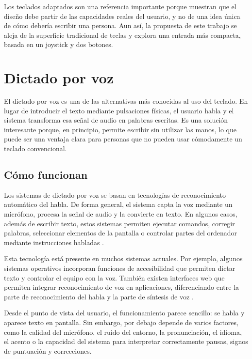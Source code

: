 Los teclados adaptados son una referencia importante porque muestran que el diseño debe partir de las capacidades reales del usuario, y no de una idea única de cómo debería escribir una persona. Aun así, la propuesta de este trabajo se aleja de la superficie tradicional de teclas y explora una entrada más compacta, basada en un joystick y dos botones.


\section{Dictado por voz}
\label{sec:dictado-voz}

El dictado por voz es una de las alternativas más conocidas al uso del teclado. En lugar de introducir el texto mediante pulsaciones físicas, el usuario habla y el sistema transforma esa señal de audio en palabras escritas. Es una solución interesante porque, en principio, permite escribir sin utilizar las manos, lo que puede ser una ventaja clara para personas que no pueden usar cómodamente un teclado convencional.

\subsection{Cómo funcionan}

Los sistemas de dictado por voz se basan en tecnologías de reconocimiento automático del habla. De forma general, el sistema capta la voz mediante un micrófono, procesa la señal de audio y la convierte en texto. En algunos casos, además de escribir texto, estos sistemas permiten ejecutar comandos, corregir palabras, seleccionar elementos de la pantalla o controlar partes del ordenador mediante instrucciones habladas \cite{webSpeechApi,microsoftVoiceAccess}.

Esta tecnología está presente en muchos sistemas actuales. Por ejemplo, algunos sistemas operativos incorporan funciones de accesibilidad que permiten dictar texto y controlar el equipo con la voz. También existen interfaces web que permiten integrar reconocimiento de voz en aplicaciones, diferenciando entre la parte de reconocimiento del habla y la parte de síntesis de voz \cite{webSpeechApi,appleVoiceControl}.

Desde el punto de vista del usuario, el funcionamiento parece sencillo: se habla y aparece texto en pantalla. Sin embargo, por debajo depende de varios factores, como la calidad del micrófono, el ruido del entorno, la pronunciación, el idioma, el acento o la capacidad del sistema para interpretar correctamente pausas, signos de puntuación y correcciones.

